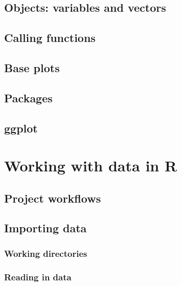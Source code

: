 \documentclass[
]{book}
\begin{document}
\hypertarget{objects-variables-and-vectors}{%
\section{Objects: variables and vectors}\label{objects-variables-and-vectors}}

\hypertarget{calling-functions}{%
\section{Calling functions}\label{calling-functions}}

\hypertarget{base-plots}{%
\section{Base plots}\label{base-plots}}

\hypertarget{packages}{%
\section{Packages}\label{packages}}

\hypertarget{ggplot}{%
\section{ggplot}\label{ggplot}}

\hypertarget{working-with-data-in-r}{%
\chapter{Working with data in R}\label{working-with-data-in-r}}

\hypertarget{project-workflows}{%
\section{Project workflows}\label{project-workflows}}

\hypertarget{importing-data}{%
\section{Importing data}\label{importing-data}}

\hypertarget{working-directories}{%
\subsection{Working directories}\label{working-directories}}

\hypertarget{reading-in-data}{%
\subsection{Reading in data}\label{reading-in-data}}
\end{document}
